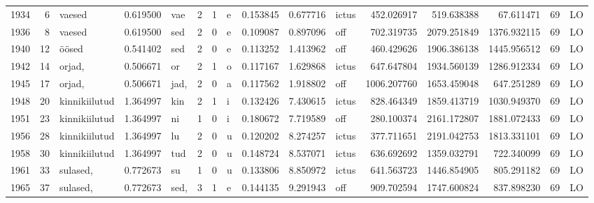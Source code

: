 \begin{tabular}{lrlrllllrrlrrrll}
1934 &           6 &           vaesed &  0.619500 &     vae &        2 &      1 &       e &      0.153845 &      0.677716 &  ictus &   452.026917 &   519.638388 &    67.611471 &     69 &        LO \\
1936 &           8 &           vaesed &  0.619500 &     sed &        2 &      0 &       e &      0.109087 &      0.897096 &    off &   702.319735 &  2079.251849 &  1376.932115 &     69 &        LO \\
1940 &          12 &            öösed &  0.541402 &     sed &        2 &      0 &       e &      0.113252 &      1.413962 &    off &   460.429626 &  1906.386138 &  1445.956512 &     69 &        LO \\
1942 &          14 &           orjad, &  0.506671 &      or &        2 &      1 &       o &      0.117167 &      1.629868 &  ictus &   647.647804 &  1934.560139 &  1286.912334 &     69 &        LO \\
1945 &          17 &           orjad, &  0.506671 &    jad, &        2 &      0 &       a &      0.117562 &      1.918802 &    off &  1006.207760 &  1653.459048 &   647.251289 &     69 &        LO \\
1948 &          20 &    kinnikiilutud &  1.364997 &     kin &        2 &      1 &       i &      0.132426 &      7.430615 &  ictus &   828.464349 &  1859.413719 &  1030.949370 &     69 &        LO \\
1951 &          23 &    kinnikiilutud &  1.364997 &      ni &        1 &      0 &       i &      0.180672 &      7.719589 &    off &   280.100374 &  2161.172807 &  1881.072433 &     69 &        LO \\
1956 &          28 &    kinnikiilutud &  1.364997 &      lu &        2 &      0 &       u &      0.120202 &      8.274257 &  ictus &   377.711651 &  2191.042753 &  1813.331101 &     69 &        LO \\
1958 &          30 &    kinnikiilutud &  1.364997 &     tud &        2 &      0 &       u &      0.148724 &      8.537071 &  ictus &   636.692692 &  1359.032791 &   722.340099 &     69 &        LO \\
1961 &          33 &         sulased, &  0.772673 &      su &        1 &      0 &       u &      0.133806 &      8.850972 &  ictus &   641.563723 &  1446.854905 &   805.291182 &     69 &        LO \\
1965 &          37 &         sulased, &  0.772673 &    sed, &        3 &      1 &       e &      0.144135 &      9.291943 &    off &   909.702594 &  1747.600824 &   837.898230 &     69 &        LO \\
\bottomrule
\end{tabular}
